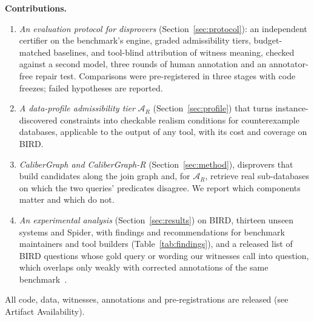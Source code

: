 \textbf{Contributions.}
\begin{enumerate}
\item \emph{An evaluation protocol for disprovers} (Section~\ref{sec:protocol}): an independent certifier on the benchmark's engine, graded admissibility tiers, budget-matched baselines, and tool-blind attribution of witness meaning, checked against a second model, three rounds of human annotation and an annotator-free repair test. Comparisons were pre-registered in three stages with code freezes; failed hypotheses are reported.
\item \emph{A data-profile admissibility tier} $\mathcal A_R$ (Section~\ref{sec:profile}) that turns instance-discovered constraints into checkable realism conditions for counterexample databases, applicable to the output of any tool, with its cost and coverage on BIRD.
\item \emph{CaliberGraph and CaliberGraph-R} (Section~\ref{sec:method}), disprovers that build candidates along the join graph and, for $\mathcal A_R$, retrieve real sub-databases on which the two queries' predicates disagree. We report which components matter and which do not.
\item \emph{An experimental analysis} (Section~\ref{sec:results}) on BIRD, thirteen unseen systems and Spider, with findings and recommendations for benchmark maintainers and tool builders (Table~\ref{tab:findings}), and a released list of  BIRD questions whose gold query or wording our witnesses call into question, which overlaps only weakly with corrected annotations of the same benchmark~\cite{jin2026annotation}.
\end{enumerate}
All code, data, witnesses, annotations and pre-registrations are released (see Artifact Availability).
